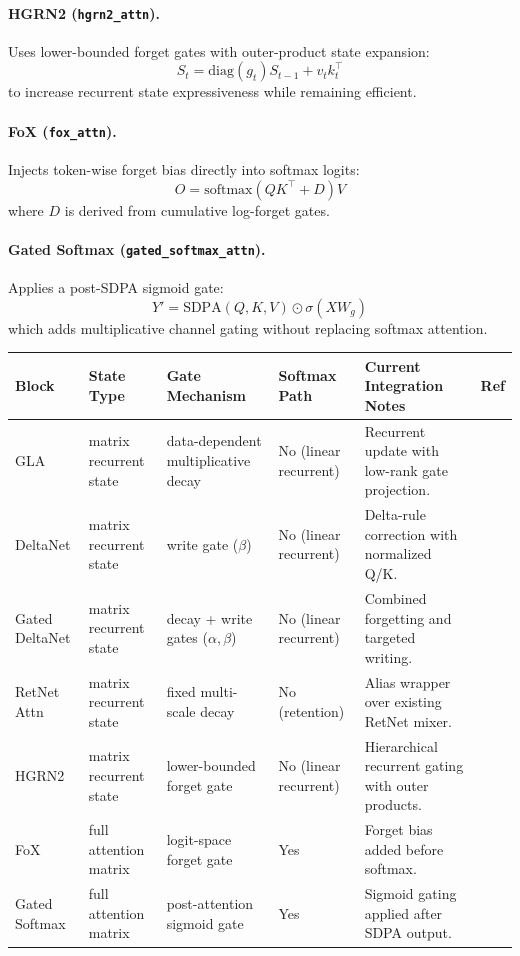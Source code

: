 \documentclass[11pt,a4paper]{article}
\begin{document}
\paragraph{HGRN2 (\texttt{hgrn2\_attn}).}
Uses lower-bounded forget gates with outer-product state expansion:
\[
S_t=\text{diag}(g_t)S_{t-1}+v_tk_t^\top
\]
to increase recurrent state expressiveness while remaining efficient.
\citep{qin_hgrn2_2024}

\paragraph{FoX (\texttt{fox\_attn}).}
Injects token-wise forget bias directly into softmax logits:
\[
O=\text{softmax}(QK^\top + D)V
\]
where $D$ is derived from cumulative log-forget gates.
\citep{lin_forgetting_transformer_2025}

\paragraph{Gated Softmax (\texttt{gated\_softmax\_attn}).}
Applies a post-SDPA sigmoid gate:
\[
Y'=\text{SDPA}(Q,K,V)\odot \sigma(XW_g)
\]
which adds multiplicative channel gating without replacing softmax attention.
\citep{qiu_gated_attention_2025}

\small
\begin{longtable}{p{2.4cm}p{2.0cm}p{2.2cm}p{1.8cm}p{4.0cm}p{1.5cm}}
\toprule
\textbf{Block} & \textbf{State Type} & \textbf{Gate Mechanism} & \textbf{Softmax Path} & \textbf{Current Integration Notes} & \textbf{Ref} \\
\midrule
\endhead
GLA & matrix recurrent state & data-dependent multiplicative decay & No (linear recurrent) & Recurrent update with low-rank gate projection. & \citep{yang_gla_2023} \\
DeltaNet & matrix recurrent state & write gate ($\beta$) & No (linear recurrent) & Delta-rule correction with normalized Q/K. & \citep{yang_deltanet_2024} \\
Gated DeltaNet & matrix recurrent state & decay + write gates ($\alpha,\beta$) & No (linear recurrent) & Combined forgetting and targeted writing. & \citep{yang_gated_deltanet_2024} \\
RetNet Attn & matrix recurrent state & fixed multi-scale decay & No (retention) & Alias wrapper over existing RetNet mixer. & \citep{sun_retentive_2023} \\
HGRN2 & matrix recurrent state & lower-bounded forget gate & No (linear recurrent) & Hierarchical recurrent gating with outer products. & \citep{qin_hgrn2_2024} \\
FoX & full attention matrix & logit-space forget gate & Yes & Forget bias added before softmax. & \citep{lin_forgetting_transformer_2025} \\
Gated Softmax & full attention matrix & post-attention sigmoid gate & Yes & Sigmoid gating applied after SDPA output. & \citep{qiu_gated_attention_2025} \\
\bottomrule
\end{longtable}
\normalsize
\end{document}
